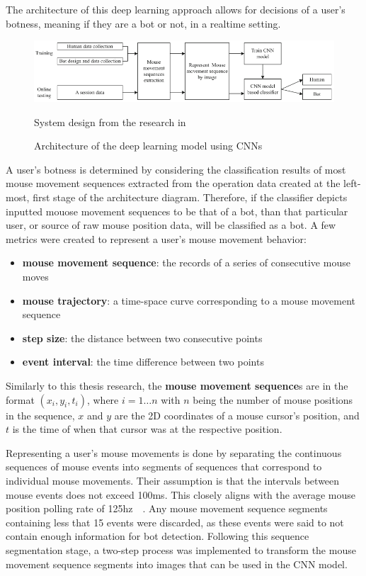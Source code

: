 The architecture of this deep learning approach allows for decisions of a user's botness, meaning if they are a bot or not, in a realtime setting.
\begin{figure}[!h]
    \includegraphics[width=1\columnwidth]{figures/deep_learning_with_mouse_dynamics_system_architecture}
    \caption{Architecture of the deep learning model using CNNs}
    {\small System design from the research in~\cite{deep_learning_detection_with_mouse_behavior}}
    \label{fig:deep-learning-architecture}
\end{figure}
A user's botness is determined by considering the classification results of most mouse movement sequences extracted from the operation data created at the left-most, first stage of the architecture diagram.
Therefore, if the classifier depicts inputted mouose movement sequences to be that of a bot, than that particular user, or source of raw mouse position data, will be classified as a bot.
A few metrics were created to represent a user's mouse movement behavior:
\begin{itemize}
    \item \textbf{mouse movement sequence}: the records of a series of consecutive mouse moves
    \item \textbf{mouse trajectory}: a time-space curve corresponding to a mouse movement sequence
    \item \textbf{step size}: the distance between two consecutive points
    \item \textbf{event interval}: the time difference between two points
\end{itemize}
Similarly to this thesis research, the \textbf{mouse movement sequence}s are in the format $(x_i, y_i, t_i)$, where $i = 1{\dots}n$ with $n$ being the number of mouse positions in the sequence, $x$ and $y$ are the 2D coordinates of a mouse cursor's position, and $t$ is the time of when that cursor was at the respective position.

Representing a user's mouse movements is done by separating the continuous sequences of mouse events into segments of sequences that correspond to individual mouse movements.
Their assumption is that the intervals between mouse events does not exceed 100ms.
This closely aligns with the average mouse position polling rate of 125hz~\cite{mouse_dpi_and_polling_rate_explained}~\cite{mouse_dpi_and_usb_polling_rate}.
Any mouse movement sequence segments containing less that 15 events were discarded, as these events were said to not contain enough information for bot detection.
Following this sequence segmentation stage, a two-step process was implemented to transform the mouse movement sequence segments into images that can be used in the CNN model.

